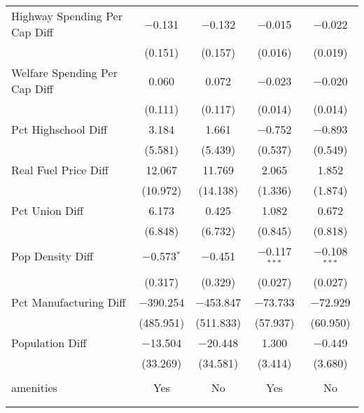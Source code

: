 \begin{table}[!htbp]
\begin{tabular}{@{\extracolsep{5pt}}lcccc}
  Highway Spending Per Cap Diff & $-$0.131 & $-$0.132 & $-$0.015 & $-$0.022 \\ 
  & (0.151) & (0.157) & (0.016) & (0.019) \\ 
  Welfare Spending Per Cap Diff & 0.060 & 0.072 & $-$0.023 & $-$0.020 \\ 
  & (0.111) & (0.117) & (0.014) & (0.014) \\ 
  Pct Highschool Diff & 3.184 & 1.661 & $-$0.752 & $-$0.893 \\ 
  & (5.581) & (5.439) & (0.537) & (0.549) \\ 
  Real Fuel Price Diff & 12.067 & 11.769 & 2.065 & 1.852 \\ 
  & (10.972) & (14.138) & (1.336) & (1.874) \\ 
  Pct Union Diff & 6.173 & 0.425 & 1.082 & 0.672 \\ 
  & (6.848) & (6.732) & (0.845) & (0.818) \\ 
  Pop Density Diff & $-$0.573$^{*}$ & $-$0.451 & $-$0.117$^{***}$ & $-$0.108$^{***}$ \\ 
  & (0.317) & (0.329) & (0.027) & (0.027) \\ 
  Pct Manufacturing Diff & $-$390.254 & $-$453.847 & $-$73.733 & $-$72.929 \\ 
  & (485.951) & (511.833) & (57.937) & (60.950) \\ 
  Population Diff & $-$13.504 & $-$20.448 & 1.300 & $-$0.449 \\ 
  & (33.269) & (34.581) & (3.414) & (3.680) \\ 
 \hline \\[-1.8ex] 
amenities & Yes & No & Yes & No \\ 
\hline \\[-1.8ex] 
\hline 
\hline \\[-1.8ex] 
\end{tabular} 
\end{table} 
